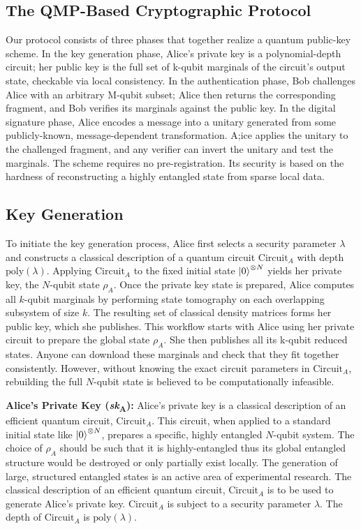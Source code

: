 \documentclass[a0,portrait]{a0poster}
\theoremstyle{definition}
\begin{document}
\begin{multicols}{2}
\section*{The QMP-Based Cryptographic Protocol}
Our protocol consists of
three phases that together realize a quantum public-key scheme. In the key generation phase, Alice’s private key is a polynomial-depth circuit; her public key is the full set of k-qubit marginals of the circuit’s output state, checkable via local consistency. In the authentication phase, Bob challenges Alice with an arbitrary M-qubit subset; Alice then returns the corresponding fragment, and Bob verifies its marginals against the public key. In the digital signature phase, Alice encodes a message into a unitary generated from some publicly-known, message-dependent transformation. A;ice applies the unitary to the challenged fragment, and any verifier can invert the unitary and test the marginals. The scheme requires no pre-registration. Its security is based on the hardness of reconstructing a highly entangled state from sparse local data.

\subsection*{Key Generation}

To initiate the key generation process, Alice first selects a security parameter $\lambda$ and constructs a classical description of a quantum circuit $\text{Circuit}_A$ with depth $\mathrm{poly}(\lambda)$. Applying $\text{Circuit}_A$ to the fixed initial state $\ket{0}^{\otimes N}$ yields her private key, the $N$-qubit state $\rho_A$. Once the private key state is prepared, Alice computes all $k$-qubit marginals by performing state tomography on each overlapping subsystem of size $k$. The resulting set of classical density matrices forms her public key, which she publishes. This workflow starts with Alice using her private circuit to prepare the global state $\rho_{A}$. She then publishes all its k-qubit reduced states. Anyone can download these marginals and check that they fit together consistently. However, without knowing the exact circuit parameters in $\text{Circuit}_A$, rebuilding the full $N$-qubit state is believed to be computationally infeasible.

\textbf{Alice's Private Key (\textit{sk}\textsubscript{A}):}  
Alice's private key is a classical description of an efficient quantum circuit, $\text{Circuit}_A$. This circuit, when applied to a standard initial state like $\ket{0}^{\otimes N}$, prepares a specific, highly entangled $N$-qubit system. The choice of $\rho_A$ should be such that it is highly-entangled thus its global entangled structure would be destroyed or only partially exist locally. The generation of large, structured entangled states is an active area of experimental research. The classical description of an efficient quantum circuit, $\text{Circuit}_A$ is to be used to generate Alice's private key. $\text{Circuit}_A$ is subject to a security parameter $\lambda$. The depth of $\text{Circuit}_A$ is $\text{poly}(\lambda)$.


\end{multicols}
\end{document}

